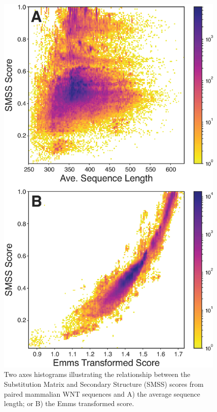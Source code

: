 \documentclass[twocolumn]{bmcart}  %
\begin{document}
\begin{figure}[t]
  \begin{center}
  \includegraphics[height=0.4\textheight]{../figures/rdmcl_scoring.eps}
\end{center}
\caption{Two axes histograms illustrating the relationship between the Substitution Matrix and Secondary Structure (SMSS) scores from paired mammalian WNT sequences and A) the average sequence length;
or B) the Emms transformed score.}
\label{fig:rdmclscores}
\end{figure}
\end{document}
